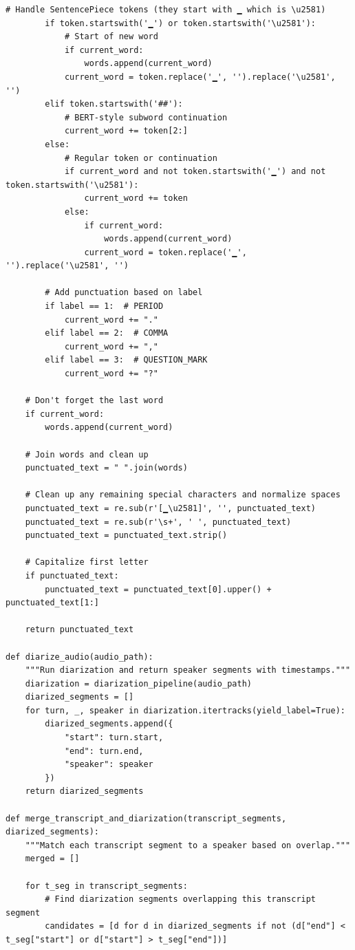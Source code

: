 \begin{lstlisting}[style=pythonstyle, caption={transcribe.py}, label={lst:transcribe.py}]
        # Handle SentencePiece tokens (they start with ▁ which is \u2581)
        if token.startswith('▁') or token.startswith('\u2581'):
            # Start of new word
            if current_word:
                words.append(current_word)
            current_word = token.replace('▁', '').replace('\u2581', '')
        elif token.startswith('##'):
            # BERT-style subword continuation
            current_word += token[2:]
        else:
            # Regular token or continuation
            if current_word and not token.startswith('▁') and not token.startswith('\u2581'):
                current_word += token
            else:
                if current_word:
                    words.append(current_word)
                current_word = token.replace('▁', '').replace('\u2581', '')
        
        # Add punctuation based on label
        if label == 1:  # PERIOD
            current_word += "."
        elif label == 2:  # COMMA
            current_word += ","
        elif label == 3:  # QUESTION_MARK
            current_word += "?"
    
    # Don't forget the last word
    if current_word:
        words.append(current_word)
    
    # Join words and clean up
    punctuated_text = " ".join(words)
    
    # Clean up any remaining special characters and normalize spaces
    punctuated_text = re.sub(r'[▁\u2581]', '', punctuated_text)
    punctuated_text = re.sub(r'\s+', ' ', punctuated_text)
    punctuated_text = punctuated_text.strip()
    
    # Capitalize first letter
    if punctuated_text:
        punctuated_text = punctuated_text[0].upper() + punctuated_text[1:]
    
    return punctuated_text

def diarize_audio(audio_path):
    """Run diarization and return speaker segments with timestamps."""
    diarization = diarization_pipeline(audio_path)
    diarized_segments = []
    for turn, _, speaker in diarization.itertracks(yield_label=True):
        diarized_segments.append({
            "start": turn.start,
            "end": turn.end,
            "speaker": speaker
        })
    return diarized_segments

def merge_transcript_and_diarization(transcript_segments, diarized_segments):
    """Match each transcript segment to a speaker based on overlap."""
    merged = []

    for t_seg in transcript_segments:
        # Find diarization segments overlapping this transcript segment
        candidates = [d for d in diarized_segments if not (d["end"] < t_seg["start"] or d["start"] > t_seg["end"])]


\end{lstlisting}
